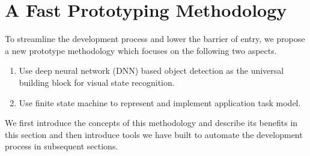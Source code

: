 



\section{A Fast Prototyping Methodology}

To streamline the development process and lower the barrier of entry, we propose
a new prototype methodology which focuses on the following two aspects.
\begin{enumerate}
  \item  Use deep neural network (DNN) based object detection as the universal
  building block for visual state recognition.
  \item Use finite state machine to represent and implement application task model.
\end{enumerate}
We first introduce the concepts of this methodology and describe its benefits in
this section and then introduce tools we have built to automate the development
process in subsequent sections.

